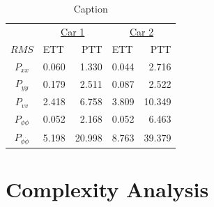 \begin{table}[ht]
    \centering
        \begin{tabular}{c|lr|lr}
            \multicolumn{1}{c}{} & \multicolumn{2}{c}{\underline{Car 1}} & \multicolumn{2}{c}{\underline{Car 2}} \\ [1mm]
            $RMS$ & ETT & PTT & ETT & PTT \\ [0.5mm]
            \hline
            $P_{xx}$                   & 0.060 &  1.330 & 0.044 &  2.716 \\ [0.25mm]
            $P_{yy}$                   & 0.179 &  2.511 & 0.087 &  2.522 \\ [0.25mm]
            $P_{vv}$                   & 2.418 &  6.758 & 3.809 & 10.349 \\ [0.25mm]
            $P_{\phi\phi}$             & 0.052 &  2.168 & 0.052 &  6.463 \\ [0.25mm]
            $P_{\dot{\phi}\dot{\phi}}$ & 5.198 & 20.998 & 8.763 & 39.379
        \end{tabular}
    \caption{Caption}
    \label{tab:my_label}
\end{table}



\section{Complexity Analysis}